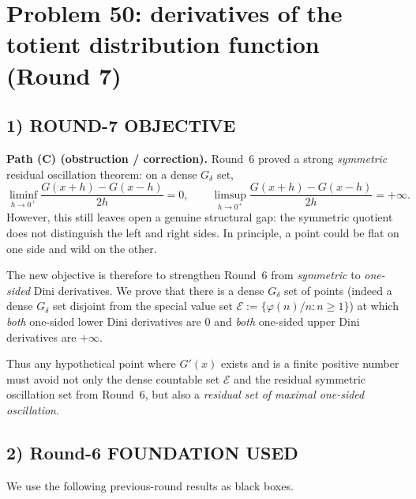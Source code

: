\section{Problem 50: derivatives of the totient distribution function (Round 7)}

\subsection{1) ROUND-7 OBJECTIVE}

\textbf{Path (C) (obstruction / correction).}
Round~6 proved a strong \emph{symmetric} residual oscillation theorem: on a dense $G_\delta$ set,
\[
\liminf_{h\to0^+}\frac{G(x+h)-G(x-h)}{2h}=0,
\qquad
\limsup_{h\to0^+}\frac{G(x+h)-G(x-h)}{2h}=+\infty.
\]
However, this still leaves open a genuine structural gap: the symmetric quotient does not distinguish the
left and right sides. In principle, a point could be flat on one side and wild on the other.

The new objective is therefore to strengthen Round~6 from \emph{symmetric} to \emph{one-sided} Dini derivatives.
We prove that there is a dense $G_\delta$ set of points (indeed a dense $G_\delta$ set disjoint from the special value set
$\mathcal E:=\{\varphi(n)/n:n\ge1\}$) at which \emph{both} one-sided lower Dini derivatives are $0$ and \emph{both}
one-sided upper Dini derivatives are $+\infty$.

Thus any hypothetical point where $G'(x)$ exists and is a finite positive number must avoid not only the dense countable set
$\mathcal E$ and the residual symmetric oscillation set from Round~6, but also a \emph{residual set of maximal one-sided oscillation}.

\subsection{2) Round-6 FOUNDATION USED}

We use the following previous-round results as black boxes.

